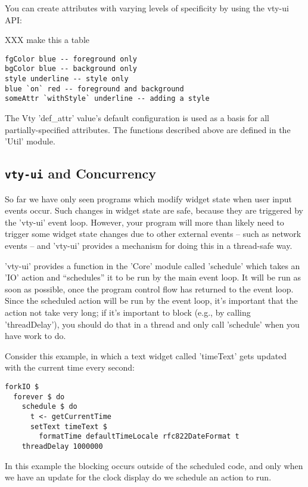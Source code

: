 You can create attributes with varying levels of specificity by using
the vty-ui API:

XXX make this a table
\begin{verbatim}
fgColor blue -- foreground only
bgColor blue -- background only
style underline -- style only
blue `on` red -- foreground and background
someAttr `withStyle` underline -- adding a style
\end{verbatim}

The Vty 'def\_attr' value's default configuration is used as a basis for
all partially-specified attributes.  The functions described above are
defined in the 'Util' module.

\subsection{\texttt{vty-ui} and Concurrency}
\label{sec:concurrency}

So far we have only seen programs which modify widget state when user
input events occur.  Such changes in widget state are safe, because
they are triggered by the 'vty-ui' event loop.  However, your program
will more than likely need to trigger some widget state changes due to
other external events -- such as network events -- and 'vty-ui'
provides a mechanism for doing this in a thread-safe way.

'vty-ui' provides a function in the 'Core' module called 'schedule'
which takes an 'IO' action and ``schedules'' it to be run by the main
event loop.  It will be run as soon as possible, once the program
control flow has returned to the event loop.  Since the scheduled
action will be run by the event loop, it's important that the action
not take very long; if it's important to block (e.g., by calling
'threadDelay'), you should do that in a thread and only call
'schedule' when you have work to do.

Consider this example, in which a text widget called 'timeText' gets
updated with the current time every second:

\begin{verbatim}
forkIO $
  forever $ do
    schedule $ do
      t <- getCurrentTime
      setText timeText $
        formatTime defaultTimeLocale rfc822DateFormat t
    threadDelay 1000000
\end{verbatim}

In this example the blocking occurs outside of the scheduled code, and
only when we have an update for the clock display do we schedule an
action to run.

